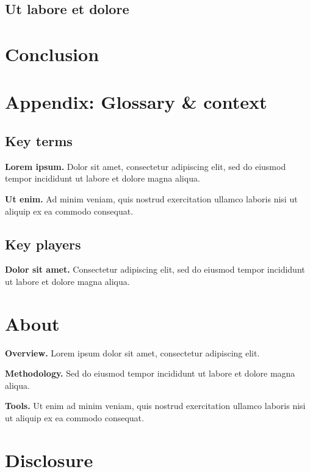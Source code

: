 \documentclass[11pt]{article}
\begin{document}
\lipsum[7]

\subsection{Ut labore et dolore}

\lipsum[8]

\section*{Conclusion}

\lipsum[9-10]

\clearpage
\section*{Appendix: Glossary \& context}

\subsection*{Key terms}

\textbf{Lorem ipsum.} Dolor sit amet, consectetur adipiscing elit, sed do eiusmod tempor incididunt ut labore et dolore magna aliqua.

\textbf{Ut enim.} Ad minim veniam, quis nostrud exercitation ullamco laboris nisi ut aliquip ex ea commodo consequat.

\subsection*{Key players}

\textbf{Dolor sit amet.} Consectetur adipiscing elit, sed do eiusmod tempor incididunt ut labore et dolore magna aliqua.

\section*{About}

\textbf{Overview.} Lorem ipsum dolor sit amet, consectetur adipiscing elit.

\textbf{Methodology.} Sed do eiusmod tempor incididunt ut labore et dolore magna aliqua.

\textbf{Tools.} Ut enim ad minim veniam, quis nostrud exercitation ullamco laboris nisi ut aliquip ex ea commodo consequat.

\section*{Disclosure}

\lipsum[11]
\end{document}

